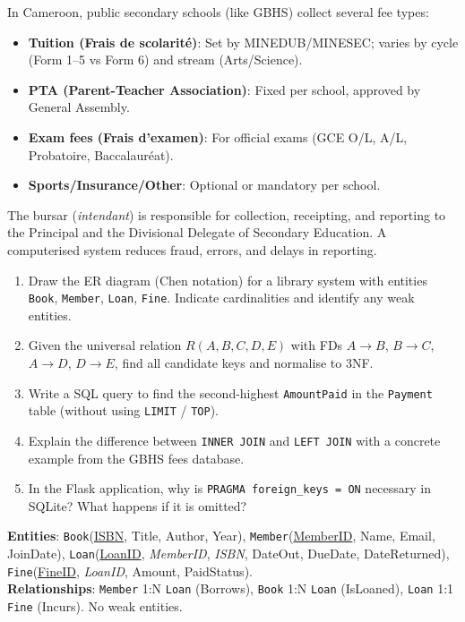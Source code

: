 \documentclass[11pt]{article}
\begin{document}
\begin{savaistu}
In Cameroon, public secondary schools (like GBHS) collect several fee types:
\begin{itemize}
    \item \textbf{Tuition (Frais de scolarité)}: Set by MINEDUB/MINESEC; varies by cycle (Form 1--5 vs Form 6) and stream (Arts/Science).
    \item \textbf{PTA (Parent-Teacher Association)}: Fixed per school, approved by General Assembly.
    \item \textbf{Exam fees (Frais d'examen)}: For official exams (GCE O/L, A/L, Probatoire, Baccalauréat).
    \item \textbf{Sports/Insurance/Other}: Optional or mandatory per school.
\end{itemize}
The bursar (\emph{intendant}) is responsible for collection, receipting, and reporting to the Principal and the Divisional Delegate of Secondary Education. A computerised system reduces fraud, errors, and delays in reporting.
\end{savaistu}

\begin{exercice}
\begin{enumerate}
    \item Draw the ER diagram (Chen notation) for a library system with entities \texttt{Book}, \texttt{Member}, \texttt{Loan}, \texttt{Fine}. Indicate cardinalities and identify any weak entities.
    \item Given the universal relation $R(A,B,C,D,E)$ with FDs $A \rightarrow B$, $B \rightarrow C$, $A \rightarrow D$, $D \rightarrow E$, find all candidate keys and normalise to 3NF.
    \item Write a SQL query to find the second-highest \texttt{AmountPaid} in the \texttt{Payment} table (without using \texttt{LIMIT} / \texttt{TOP}).
    \item Explain the difference between \texttt{INNER JOIN} and \texttt{LEFT JOIN} with a concrete example from the GBHS fees database.
    \item In the Flask application, why is \texttt{PRAGMA foreign\_keys = ON} necessary in SQLite? What happens if it is omitted?
\end{enumerate}
\end{exercice}

\begin{corrige}[Exercise 1]
\textbf{Entities}: \texttt{Book}(\underline{ISBN}, Title, Author, Year), \texttt{Member}(\underline{MemberID}, Name, Email, JoinDate), \texttt{Loan}(\underline{LoanID}, \textit{MemberID}, \textit{ISBN}, DateOut, DueDate, DateReturned), \texttt{Fine}(\underline{FineID}, \textit{LoanID}, Amount, PaidStatus).\\
\textbf{Relationships}: \texttt{Member} 1:N \texttt{Loan} (Borrows), \texttt{Book} 1:N \texttt{Loan} (IsLoaned), \texttt{Loan} 1:1 \texttt{Fine} (Incurs). No weak entities.
\end{corrige}
\end{document}
